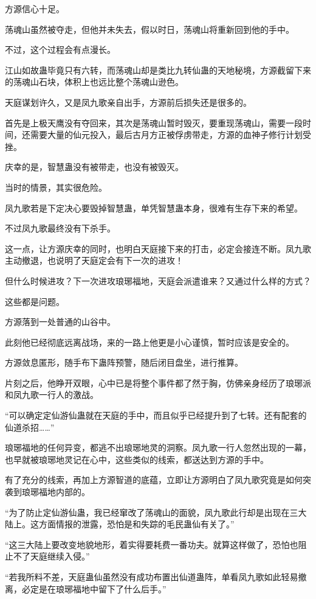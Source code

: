 \begin{this_body}
方源信心十足。

荡魂山虽然被夺走，但他并未失去，假以时日，荡魂山将重新回到他的手中。

不过，这个过程会有点漫长。

江山如故蛊毕竟只有六转，而荡魂山却是类比九转仙蛊的天地秘境，方源截留下来的荡魂山石块，体积上也远比整个荡魂山逊色。

天庭谋划许久，又是凤九歌亲自出手，方源前后损失还是很多的。

首先是上极天鹰没有夺回来，其次是荡魂山暂时毁灭，要重现荡魂山，需要一段时间，还需要大量的仙元投入，最后古月方正被俘虏带走，方源的血神子修行计划受挫。

庆幸的是，智慧蛊没有被带走，也没有被毁灭。

当时的情景，其实很危险。

凤九歌若是下定决心要毁掉智慧蛊，单凭智慧蛊本身，很难有生存下来的希望。

不过凤九歌最终没有下杀手。

这一点，让方源庆幸的同时，也明白天庭接下来的打击，必定会接连不断。凤九歌主动撤退，也说明了天庭定会有下一次的进攻！

但什么时候进攻？下一次进攻琅琊福地，天庭会派遣谁来？又通过什么样的方式？

这些都是问题。

方源落到一处普通的山谷中。

此刻他已经彻底远离战场，来的一路上他更是小心谨慎，暂时应该是安全的。

方源敛息匿形，随手布下蛊阵预警，随后闭目盘坐，进行推算。

片刻之后，他睁开双眼，心中已是将整个事件都了然于胸，仿佛亲身经历了琅琊派和凤九歌一行人的激战。

“可以确定定仙游仙蛊就在天庭的手中，而且似乎已经提升到了七转。还有配套的仙道杀招……”

琅琊福地的任何异变，都逃不出琅琊地灵的洞察。凤九歌一行人忽然出现的一幕，也早就被琅琊地灵记在心中，这些类似的线索，都送达到方源的手中。

有了充分的线索，再加上方源智道的底蕴，立即让方源明白了凤九歌究竟是如何突袭到琅琊福地内部的。

“为了防止定仙游仙蛊，我已经窜改了荡魂山的面貌，凤九歌此行却是出现在三大陆上。这方面情报的泄露，恐怕是和失踪的毛民蛊仙有关了。”

“这三大陆上要改变地貌地形，着实得要耗费一番功夫。就算这样做了，恐怕也阻止不了天庭继续入侵。”

“若我所料不差，天庭蛊仙虽然没有成功布置出仙道蛊阵，单看凤九歌如此轻易撤离，必定是在琅琊福地中留下了什么后手。”


\end{this_body}
